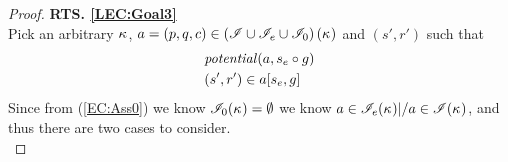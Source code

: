 \begin{lemma}
\begin{proof}

\noindent\textbf{RTS. \ref{LEC:Goal3}}\\
Pick an arbitrary $\kappa_{}$, $a = (p, q, c) \in \left(\mathscr{I} \cup \mathscr{I}_e \cup \mathscr{I}_0 \right)(\kappa_{})$ and $(s', r')$ such that
%
\begin{align}
	& \mathit{potential}(a, s_e \circ g)  \label{LEC:ass1}\\
	& (s', r') \in a[s_e, g] \label{LEC:ass2}
\end{align}
Since from (\ref{EC:Ass0}) we know $\mathscr{I}_0(\kappa_{}) = \emptyset$ we know $a \in \mathscr{I}_e(\kappa_{}) |/  a \in\mathscr{I}(\kappa_{})$, and thus there are two cases to consider. \\


\end{proof}
\end{lemma}
